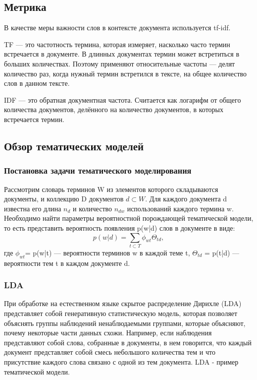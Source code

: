 \documentclass{article}
\begin{document}
\subsection{Метрика}
В качестве меры важности слов в контексте документа используется tf-idf. 

TF — это частотность термина, которая измеряет, насколько часто термин встречается в документе. В длинных документах термин может встретиться в больших количествах. Поэтому применяют относительные частоты — делят количество раз, когда нужный термин встретился в тексте, на общее количество слов в данном тексте.
 
IDF — это обратная документная частота. Считается как логарифм от общего количества документов, делённого на количество документов, в которых встречается термин.

\subsection{Обзор тематических моделей}

\subsubsection{Постановка задачи тематического моделирования}
Рассмотрим  словарь терминов W из элементов которого складываются документы, и коллекцию D документов $d \subset W$.  Для каждого документа d известна его длина $n_{d}$ и количество $n_{dw}$ использований каждого термина w. Необходимо найти параметры вероятностной порождающей тематической модели, то есть представить вероятность появления p(w|d) слов в документе в виде:
\begin{equation}
p(w|d) = \sum\limits_{t \subset T} \phi_{wt}\Theta_{td}, 
\end{equation}
где $\phi_{wt}$= p(w|t) — вероятности терминов w в каждой теме t, $\Theta_{td}$ = p(t|d) — вероятности тем t в каждом документе d.

\subsubsection{LDA}
При обработке на естественном языке скрытое распределение Дирихле (LDA) представляет собой генеративную статистическую модель, которая позволяет объяснять группы наблюдений ненаблюдаемыми группами, которые объясняют, почему некоторые части данных схожи. Например, если наблюдения представляют собой слова, собранные в документы, в нем говорится, что каждый документ представляет собой смесь небольшого количества тем и что присутствие каждого слова связано с одной из тем документа. LDA - пример тематической модели.
\end{document}
